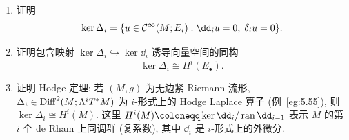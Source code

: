 \begin{exer}[椭圆复形]
\begin{enumerate}
    \begin{equation}\label{eq:5.239}
        \Delta_i \defeq \dd_{i-1} \circ \delta_i + \delta_{i+1} \circ \dd_i \in \Diff^2(M; E_i), \qquad 1 \le i \le N-1,
    \end{equation}
    是椭圆型且对称的.
    \item 证明
    \begin{equation}\label{eq:5.240}
        \ker \Delta_i = \{ u \in \Smooth(M; E_i) : \dd_i u = 0, \; \delta_i u = 0 \}.
    \end{equation}
    \item 证明包含映射 $\ker \Delta_i \hookrightarrow \ker \dd_i$ 诱导向量空间的同构
    \begin{equation}\label{eq:5.241}
        \ker \Delta_i \cong H^i(E_\bullet).
    \end{equation}
    \item 证明 Hodge 定理: 若 $(M, g)$ 为无边紧 Riemann 流形, $\Delta_i \in \operatorname{Diff}^2(M; \Lambda^i T^* M)$ 为 $i$-形式上的 Hodge Laplace 算子 (例~\ref{eg:5.55}), 则 $\ker \Delta_i \cong H^i(M)$. 这里 $H^i(M) \defeq \ker \dd_i / \ran \dd_{i-1}$ 表示 $M$ 的第 $i$ 个 de Rham 上同调群 (复系数), 其中 $\dd_i$ 是 $i$-形式上的外微分.
\end{enumerate}
\end{exer}
